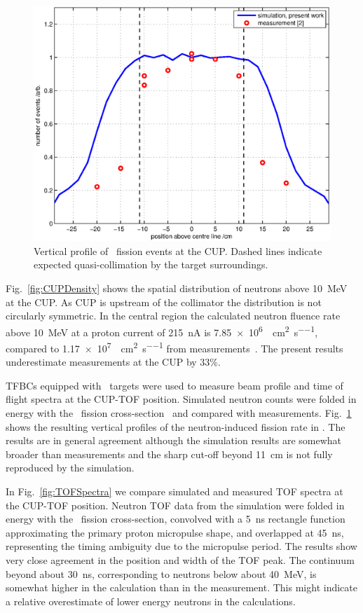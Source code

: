 \documentclass[peerreviewca,11pt,a4paper]{IEEEtran}
\let\MYoriglatexcaption\caption
\renewcommand{\caption}[2][\relax]{\MYoriglatexcaption[#2]{#2}}
\def\U238{\BPChem{\^{238}U}}
\begin{document}
\begin{figure}[!t]
    \centering
    \includegraphics[width=0.9\columnwidth]{CUPTOF10beamproRADECS.eps}
    \caption{
        Vertical profile of \U238\ fission events at the CUP.
        Dashed lines indicate expected quasi-collimation by the target surroundings.
    }
    \label{fig:CUPProfile}
\end{figure}

Fig.~\ref{fig:CUPDensity} shows the spatial distribution of neutrons above \SI{10}{\MeV} at the CUP.
As CUP is upstream of the collimator the distribution is not circularly symmetric.
In the central region the calculated neutron fluence rate above \SI{10}{\MeV} at a proton current of \SI{215}{\nA} is \SI{7.85e6}{\neutron\per\cm\squared\per\second}, compared to \SI{1.17e7}{\neutron\per\cm\squared\per\second} from measurements~\cite{Prokofiev2014}.
The present results underestimate measurements at the CUP by 33\%.

TFBCs equipped with \U238\ targets were used to measure beam profile and time of flight spectra at the CUP-TOF position.
Simulated neutron counts were folded in energy with the \U238\ fission cross-section~\cite{Carlson2009} and compared with measurements.
Fig.~\ref{fig:CUPProfile} shows the resulting vertical profiles of the neutron-induced fission rate in \U238.
The results are in general agreement although the simulation results are somewhat broader than measurements and the sharp cut-off beyond \SI{11}{\cm} is not fully reproduced by the simulation.

In Fig.~\ref{fig:TOFSpectra} we compare simulated and measured TOF spectra at the CUP-TOF position.
Neutron TOF data from the simulation were folded in energy with the \U238\ fission cross-section, convolved with a \SI{5}{\ns} rectangle function approximating the primary proton micropulse shape, and overlapped at \SI{45}{\ns}, representing the timing ambiguity due to the micropulse period.
The results show very close agreement in the position and width of the TOF peak.
The continuum beyond about \SI{30}{\ns}, corresponding to neutrons below about \SI{40}{\MeV}, is somewhat higher in the calculation than in the measurement.
This might indicate a relative overestimate of lower energy neutrons in the calculations.
\end{document}
